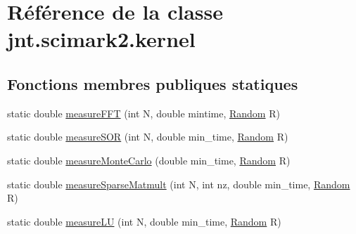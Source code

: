 \hypertarget{classjnt_1_1scimark2_1_1kernel}{\section{Référence de la classe jnt.\-scimark2.\-kernel}
\label{classjnt_1_1scimark2_1_1kernel}
}
\subsection*{Fonctions membres publiques statiques}
\begin{DoxyCompactItemize}
\item 
static double \hyperlink{classjnt_1_1scimark2_1_1kernel_acffcceaa86d37790290d655d39379ce6}{measure\-F\-F\-T} (int N, double mintime, \hyperlink{classjnt_1_1scimark2_1_1Random}{Random} R)
\item 
static double \hyperlink{classjnt_1_1scimark2_1_1kernel_a1c7e5d55ac6178c0d579c02b900faaea}{measure\-S\-O\-R} (int N, double min\-\_\-time, \hyperlink{classjnt_1_1scimark2_1_1Random}{Random} R)
\item 
static double \hyperlink{classjnt_1_1scimark2_1_1kernel_a72ec5e8caef0d8de7bbdd945542ddbcf}{measure\-Monte\-Carlo} (double min\-\_\-time, \hyperlink{classjnt_1_1scimark2_1_1Random}{Random} R)
\item 
static double \hyperlink{classjnt_1_1scimark2_1_1kernel_acca80ae40b69b52c8a38ce0c239928ed}{measure\-Sparse\-Matmult} (int N, int nz, double min\-\_\-time, \hyperlink{classjnt_1_1scimark2_1_1Random}{Random} R)
\item 
static double \hyperlink{classjnt_1_1scimark2_1_1kernel_a483ddbc1ff025f06e825397417217a22}{measure\-L\-U} (int N, double min\-\_\-time, \hyperlink{classjnt_1_1scimark2_1_1Random}{Random} R)
\end{DoxyCompactItemize}
